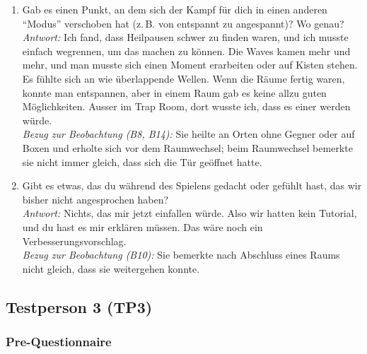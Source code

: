\documentclass[../Main.tex]{subfiles}
\begin{document}
\begin{enumerate}[label=\textbf{I\arabic*}, leftmargin=1.5cm, itemsep=1em]
\item Gab es einen Punkt, an dem sich der Kampf für dich in einen anderen \enquote{Modus} verschoben hat (z.\,B. von entspannt zu angespannt)? Wo genau? \\
\textit{Antwort:} Ich fand, dass Heilpausen schwer zu finden waren, und ich musste einfach wegrennen, um das machen zu können. Die Waves kamen mehr und mehr, und man musste sich einen Moment erarbeiten oder auf Kisten stehen. Es fühlte sich an wie überlappende Wellen. Wenn die Räume fertig waren, konnte man entspannen, aber in einem Raum gab es keine allzu guten Möglichkeiten. Ausser im Trap Room, dort wusste ich, dass es einer werden würde. \\
\textit{Bezug zur Beobachtung (B8, B14):} Sie heilte an Orten ohne Gegner oder auf Boxen und erholte sich vor dem Raumwechsel; beim Raumwechsel bemerkte sie nicht immer gleich, dass sich die Tür geöffnet hatte.

\item Gibt es etwas, das du während des Spielens gedacht oder gefühlt hast, das wir bisher nicht angesprochen haben? \\
\textit{Antwort:} Nichts, das mir jetzt einfallen würde. Also wir hatten kein Tutorial, und du hast es mir erklären müssen. Das wäre noch ein Verbesserungsvorschlag. \\
\textit{Bezug zur Beobachtung (B10):} Sie bemerkte nach Abschluss eines Raums nicht gleich, dass sie weitergehen konnte.
\end{enumerate}

\subsection{Testperson 3 (TP3)}

\subsubsection{Pre-Questionnaire}
\end{document}
